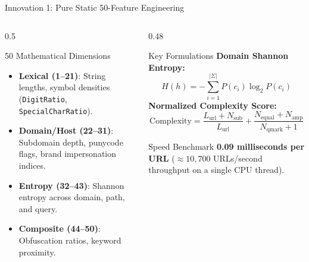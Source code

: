 \documentclass[aspectratio=169,10pt]{beamer}
\begin{document}
\begin{frame}{Innovation 1: Pure Static 50-Feature Engineering}
    \begin{columns}[T]
        \begin{column}{0.5\textwidth}
            \begin{block}{50 Mathematical Dimensions}
                \begin{itemize}
                    \item \textbf{Lexical (1--21)}: String lengths, symbol densities (\texttt{DigitRatio}, \texttt{SpecialCharRatio}).
                    \item \textbf{Domain/Host (22--31)}: Subdomain depth, punycode flags, brand impersonation indices.
                    \item \textbf{Entropy (32--43)}: Shannon entropy across domain, path, and query.
                    \item \textbf{Composite (44--50)}: Obfuscation ratios, keyword proximity.
                \end{itemize}
            \end{block}
        \end{column}
        
        \begin{column}{0.48\textwidth}
            \begin{exampleblock}{Key Formulations}
                \textbf{Domain Shannon Entropy:}
                $$H(h) = -\sum_{i=1}^{|\Sigma|} P(c_i) \log_2 P(c_i)$$
                \textbf{Normalized Complexity Score:}
                $$\text{Complexity} = \frac{L_{\text{url}} + N_{\text{sub}}}{L_{\text{url}}} + \frac{N_{\text{equal}} + N_{\text{amp}}}{N_{\text{qmark}} + 1}$$
            \end{exampleblock}
            \begin{alertblock}{Speed Benchmark}
                \textbf{0.09 milliseconds per URL} ($\approx 10,700$ URLs/second throughput on a single CPU thread).
            \end{alertblock}
        \end{column}
    \end{columns}
\end{frame}
\end{document}
